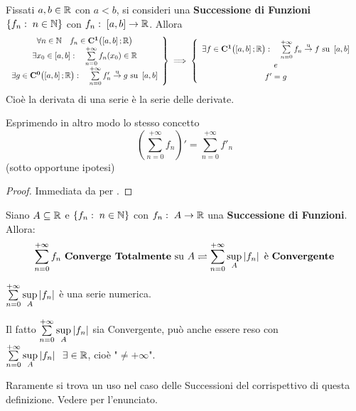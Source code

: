 \begin{corollary}
	\label{coro:deriv_serie_e_serie_derivate}
	Fissati $a, b \in \mathbb{R}$ con $a < b$, si consideri una \textbf{Successione di Funzioni} $\left\{f_n:\; n \in \mathbb{N}\right\}$ con $f_n:\; \left[a,b\right] \to \mathbb{R}$. Allora
	\[
		\left.
			\begin{array}{c}
				\forall n \in \mathbb{N} \quad f_n \in \mathbf{C^{1}} \bigl( \left[a,b\right]; \mathbb{R} \bigr)\\
				\exists x_0 \in \left[a,b\right]: \quad \sum\limits_{n = 0}^{+\infty} f_n(x_0) \in \mathbb{R}\\
				\exists g \in \mathbf{C^{0}} \bigl( \left[a,b\right]; \mathbb{R} \bigr): \quad \sum\limits_{n = 0}^{+\infty} f'_n \overset{\text{u}}{\to} g \text{ su } \left[a,b\right]
			\end{array}
		\right\}
		\implies
		\begin{cases}
			\begin{array}{c}
				\exists f \in \mathbf{C^{1}} \bigl( \left[a,b\right]; \mathbb{R} \bigr): \quad \sum\limits_{n = 0}^{+\infty} f_n \overset{\text{u}}{\to} f \text{ su } \left[a,b\right]\\
				e\\
				f' = g
			\end{array}
		\end{cases}
	\]
	Cioè la derivata di una serie è la serie delle derivate.
	\begin{note}
		Esprimendo in altro modo lo stesso concetto
		\[
			\left( \sum\limits_{n = 0}^{+\infty} f_n \right)' =
			\sum\limits_{n = 0}^{+\infty} f'_n
		\]
		(sotto opportune ipotesi)
	\end{note}
	\begin{proof}
		Immediata da  per .
	\end{proof}
\end{corollary}
\begin{definition}
	\label{def:serie_totalm_conv}
	Siano $A \subseteq \mathbb{R}$ e $\left\{f_n:\; n \in \mathbb{N}\right\}$ con $f_n:\; A \to \mathbb{R}$ una \textbf{Successione di Funzioni}. Allora:
	\[
		\sum\limits_{n = 0}^{+\infty} f_n \text{ \textbf{Converge Totalmente} su } A
		\rightleftharpoons
		\sum\limits_{n = 0}^{+\infty} \sup\limits_{A} \left|f_n\right| \text{ è \textbf{Convergente}}
	\]
	\begin{note}
		$\sum\limits_{n = 0}^{+\infty} \sup\limits_{A} \left|f_n\right|$ è una serie numerica.
	\end{note}
	\begin{note}
		Il fatto $\sum\limits_{n = 0}^{+\infty} \sup\limits_{A} \left|f_n\right|$ sia Convergente, può anche essere reso con $\sum\limits_{n = 0}^{+\infty} \sup\limits_{A} \left|f_n\right| \;\; \exists \in \mathbb{R}$, cioè "$\neq +\infty$".
	\end{note}
	\begin{note}
		Raramente si trova un uso nel caso delle Successioni del corrispettivo di questa definizione. Vedere  per l'enunciato.
	\end{note}
\end{definition}
